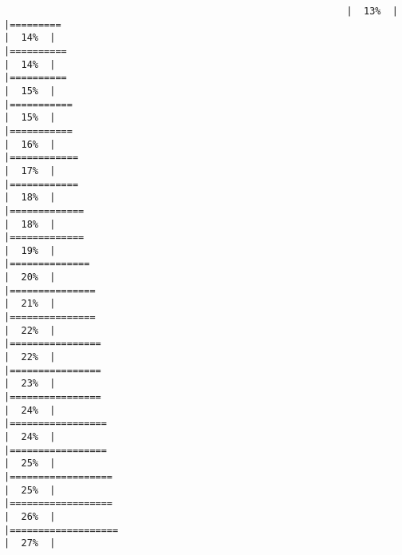 \documentclass[
]{book}
\begin{document}
\begin{verbatim}
                                                            |  13%  |                                                                              |=========                                                             |  14%  |                                                                              |==========                                                            |  14%  |                                                                              |==========                                                            |  15%  |                                                                              |===========                                                           |  15%  |                                                                              |===========                                                           |  16%  |                                                                              |============                                                          |  17%  |                                                                              |============                                                          |  18%  |                                                                              |=============                                                         |  18%  |                                                                              |=============                                                         |  19%  |                                                                              |==============                                                        |  20%  |                                                                              |===============                                                       |  21%  |                                                                              |===============                                                       |  22%  |                                                                              |================                                                      |  22%  |                                                                              |================                                                      |  23%  |                                                                              |================                                                      |  24%  |                                                                              |=================                                                     |  24%  |                                                                              |=================                                                     |  25%  |                                                                              |==================                                                    |  25%  |                                                                              |==================                                                    |  26%  |                                                                              |===================                                                   |  27%  |                                                                              
\end{verbatim}
\end{document}
